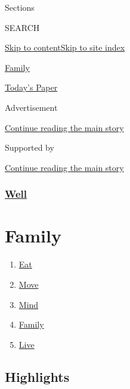 Sections

SEARCH

\protect\hyperlink{site-content}{Skip to
content}\protect\hyperlink{site-index}{Skip to site index}

\href{https://www.nytimes3xbfgragh.onion/section/well/family}{Family}

\href{https://myaccount.nytimes3xbfgragh.onion/auth/login?response_type=cookie\&client_id=vi}{}

\href{https://www.nytimes3xbfgragh.onion/section/todayspaper}{Today's
Paper}

Advertisement

\protect\hyperlink{after-top}{Continue reading the main story}

Supported by

\protect\hyperlink{after-sponsor}{Continue reading the main story}

\hypertarget{well}{%
\subsubsection{\texorpdfstring{\href{/section/well}{Well}}{Well}}\label{well}}

\hypertarget{family}{%
\section{Family}\label{family}}

\begin{enumerate}
\def\labelenumi{\arabic{enumi}.}
\tightlist
\item
  \href{/section/well/eat}{Eat}
\item
  \href{/section/well/move}{Move}
\item
  \href{/section/well/mind}{Mind}
\item
  \href{/section/well/family}{Family}
\item
  \href{/section/well/live}{Live}
\end{enumerate}

\hypertarget{highlights}{%
\subsection{Highlights}\label{highlights}}

